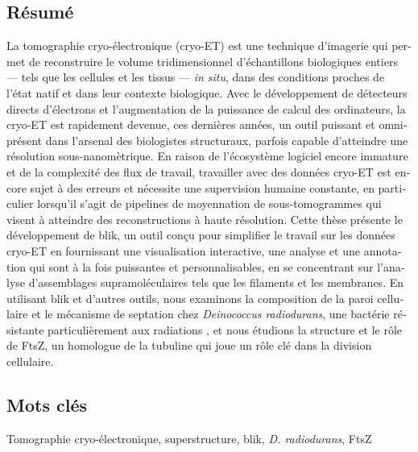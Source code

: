 \begin{otherlanguage}{french}

\section*{Résumé} %
La tomographie cryo-électronique (cryo-ET) est une technique d'imagerie qui permet de reconstruire le volume tridimensionnel d'échantillons biologiques entiers --- tels que les cellules et les tissus --- \textit{in situ}, dans des conditions proches de l'état natif et dans leur contexte biologique.
Avec le développement de détecteurs directs d'électrons et l'augmentation de la puissance de calcul des ordinateurs, la cryo-ET est rapidement devenue, ces dernières années, un outil puissant et omniprésent dans l'arsenal des biologistes structuraux, parfois capable d'atteindre une résolution sous-nanomètrique.
En raison de l'écosystème logiciel encore immature et de la complexité des flux de travail, travailler avec des données cryo-ET est encore sujet à des erreurs et nécessite une supervision humaine constante, en particulier lorsqu'il s'agit de pipelines de moyennation de sous-tomogrammes qui visent à atteindre des reconstructions à haute résolution.
Cette thèse présente le développement de blik, un outil conçu pour simplifier le travail sur les données cryo-ET en fournissant une visualisation interactive, une analyse et une annotation qui sont à la fois puissantes et personnalisables, en se concentrant sur l'analyse d'assemblages supramoléculaires tels que les filaments et les membranes.
En utilisant blik et d'autres outils, nous examinons la composition de la paroi cellulaire et le mécanisme de septation chez \textit{Deinococcus radiodurans}, une bactérie résistante particulièrement aux radiations , et nous étudions la structure et le rôle de FtsZ, un homologue de la tubuline qui joue un rôle clé dans la division cellulaire.

\subsection*{Mots clés}
Tomographie cryo-électronique, superstructure, blik, \textit{D. radiodurans}, FtsZ
    
\end{otherlanguage}
